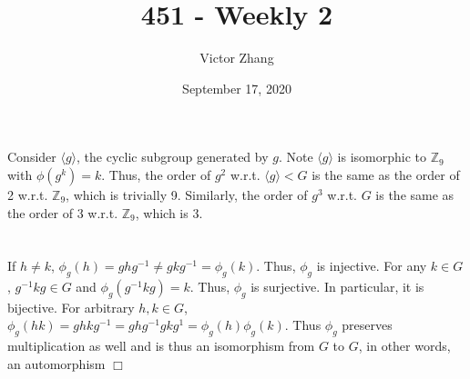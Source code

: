 \documentclass{article}
\title{451 - Weekly 2}
\author{Victor Zhang}
\date{September 17, 2020}
\newcommand{\cyclicsg}[1]{\langle {#1} \rangle}
\begin{document}
\maketitle

\section{}
Consider $\cyclicsg{g}$, the cyclic subgroup generated by $g$. Note $\cyclicsg{g}$ is isomorphic to $\mathbb{Z}_9$ with $\phi(g^k) = k$. Thus, the order of $g^2$ w.r.t. $\cyclicsg{g} < G$ is the same as the order of 2 w.r.t. $\mathbb{Z}_9$, which is trivially 9. Similarly, the order of $g^3$ w.r.t. $G$ is the same as the order of 3 w.r.t. $\mathbb{Z}_9$, which is 3.

\section{}
If $h \neq k$, $\phi_g(h) = ghg^{-1} \neq gkg^{-1} = \phi_g(k)$. Thus, $\phi_g$ is injective. For any $k \in G$, $g^{-1}kg \in G$ and $\phi_g(g^{-1}kg) = k$. Thus, $\phi_g$ is surjective. In particular, it is bijective. For arbitrary $h,k \in G$, $\phi_g(hk) = ghkg^{-1} = ghg^{-1}gkg^1 = \phi_g(h)\phi_g(k)$. Thus $\phi_g$ preserves multiplication as well and is thus an isomorphism from $G$ to $G$, in other words, an automorphism $\Box$
\end{document}
